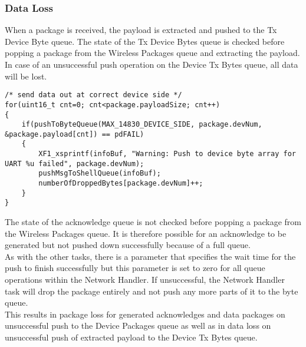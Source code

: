 \subsubsection{Data Loss}
When a package is received, the payload is extracted and pushed to the Tx Device Byte queue. The state of the Tx Device Bytes queue is checked before popping a package from the Wireless Packages queue and extracting the payload. In case of an unsuccessful push operation on the Device Tx Bytes queue, all data will be lost.
\begin{lstlisting}
/* send data out at correct device side */
for(uint16_t cnt=0; cnt<package.payloadSize; cnt++)
{
    if(pushToByteQueue(MAX_14830_DEVICE_SIDE, package.devNum, &package.payload[cnt]) == pdFAIL)
    {
        XF1_xsprintf(infoBuf, "Warning: Push to device byte array for UART %u failed", package.devNum);
        pushMsgToShellQueue(infoBuf);
        numberOfDroppedBytes[package.devNum]++;
    }
}
\end{lstlisting}
The state of the acknowledge queue is not checked before popping a package from the Wireless Packages queue. It is therefore possible for an acknowledge to be generated but not pushed down successfully because of a full queue.\\
As with the other tasks, there is a parameter that specifies the wait time for the push to finish successfully but this parameter is set to zero for all queue operations within the Network Handler. If unsuccessful, the Network Handler task will drop the package entirely and not push any more parts of it to the byte queue.\\
This results in package loss for generated acknowledges and data packages on unsuccessful push to the Device Packages queue as well as in data loss on unsuccessful push of extracted payload to the Device Tx Bytes queue.\\
